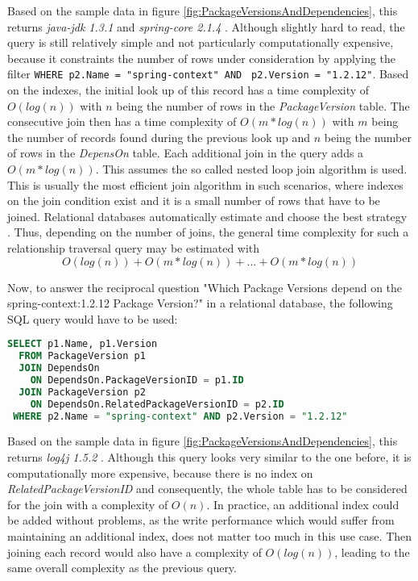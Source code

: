 Based on the sample data in figure \ref{fig:PackageVersionsAndDependencies}, this returns \emph{java-jdk 1.3.1} and \emph{spring-core 2.1.4} \cite{neo4j}. Although slightly hard to read, the query is still relatively simple and not particularly computationally expensive, because it constraints the number of rows under consideration by applying the filter \lstinline|WHERE p2.Name = "spring-context" AND | \lstinline|p2.Version = "1.2.12"|. Based on the indexes, the initial look up of this record has a time complexity of $O(log(n))$ with $n$ being the number of rows in the \emph{PackageVersion} table. The consecutive join then has a time complexity of $O(m*log(n))$ with $m$ being the number of records found during the previous look up and $n$ being the number of rows in the \emph{DepensOn} table. Each additional join in the query adds a $O(m*log(n))$. This assumes the so called nested loop join algorithm is used. This is usually the most efficient join algorithm in such scenarios, where indexes on the join condition exist and it is a small number of rows that have to be joined. Relational databases automatically estimate and choose the best strategy \cite{PostgreSQLJoin}. Thus, depending on the number of joins, the general time complexity for such a relationship traversal query may be estimated with
$$O(log(n)) + O(m*log(n)) + ... + O(m*log(n))$$ 

Now, to answer the reciprocal question "Which Package Versions depend on the spring-context:1.2.12 Package Version?" in a relational database, the following SQL query would have to be used:

\begin{lstlisting}[language=SQL, caption=Package Version Reciprocal Dependencies, captionpos=b, label=lst:PackageVersionReciprocalDependencies]
SELECT p1.Name, p1.Version
  FROM PackageVersion p1 
  JOIN DependsOn
    ON DependsOn.PackageVersionID = p1.ID
  JOIN PackageVersion p2
    ON DependsOn.RelatedPackageVersionID = p2.ID
 WHERE p2.Name = "spring-context" AND p2.Version = "1.2.12"
\end{lstlisting}

Based on the sample data in figure \ref{fig:PackageVersionsAndDependencies}, this returns \emph{log4j 1.5.2} \cite{neo4j}. Although this query looks very similar to the one before, it is computationally more expensive, because there is no index on \emph{RelatedPackageVersionID} and consequently, the whole table has to be considered for the join with a complexity of $O(n)$. In practice, an additional index could be added without problems, as the write performance which would suffer from maintaining an additional index, does not matter too much in this use case. Then joining each record would also have a complexity of $O(log(n))$, leading to the same overall complexity as the previous query.\\


